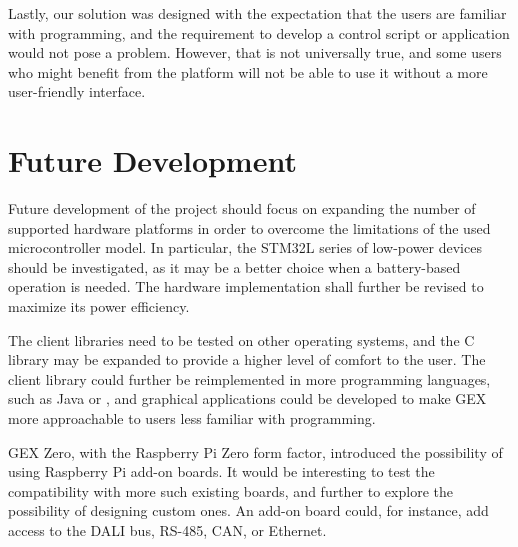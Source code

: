Lastly, our solution was designed with the expectation that the users are familiar with programming, and the requirement to develop a control script or application would not pose a problem. However, that is not universally true, and some users who might benefit from the platform will not be able to use it without a more user-friendly interface.

\section{Future Development}

Future development of the project should focus on expanding the number of supported hardware platforms in order to overcome the limitations of the used microcontroller model. In particular, the STM32L series of low-power devices should be investigated, as it may be a better choice when a battery-based operation is needed. The hardware implementation shall further be revised to maximize its power efficiency.

The client libraries need to be tested on other operating systems, and the C library may be expanded to provide a higher level of comfort to the user. The client library could further be reimplemented in more programming languages, such as Java or \CS, and graphical applications could be developed to make GEX more approachable to users less familiar with programming.

GEX Zero, with the Raspberry Pi Zero form factor, introduced the possibility of using Raspberry Pi add-on boards. It would be interesting to test the compatibility with more such existing boards, and further to explore the possibility of designing custom ones. An add-on board could, for instance, add access to the \gls{DALI} bus, RS-485, \gls{CAN}, or Ethernet.





